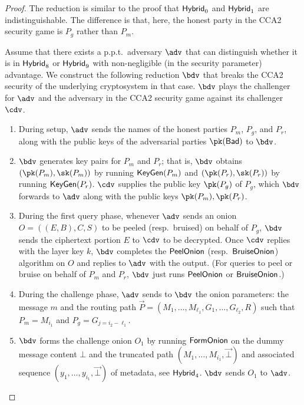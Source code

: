 \documentclass[runningheads,a4paper]{llncs}
\begin{document}
\begin{proof}
The reduction is similar to the proof that $\mathsf{Hybrid}_{0}$ and $\mathsf{Hybrid}_{1}$ are indistinguishable. The difference is that, here, the honest party in the CCA2 security game is $P_g$ rather than $P_m$. 

Assume that there exists a p.p.t.~adversary $\adv$ that can distinguish whether it is in $\mathsf{Hybrid}_{8}$ or $\mathsf{Hybrid}_{9}$ with non-negligible (in the security parameter)  advantage. 
We construct the following reduction $\bdv$ that breaks the CCA2 security of the underlying cryptosystem in that case. $\bdv$ plays the challenger for $\adv$ and the adversary in the CCA2 security game against its challenger $\cdv$.

\begin{enumerate}
\item During setup, $\adv$ sends the names of the honest parties $P_m$, $P_g$, and $P_r$, along with the public keys of the adversarial parties $\pk(\Bad)$ to $\bdv$. 

\item $\bdv$ generates key pairs for $P_m$ and $P_r$;
that is, $\bdv$ obtains $(\pk(P_m), \sk(P_m))$ by running $\mathsf{KeyGen}(P_m)$ and $(\pk(P_r), \sk(P_r))$ by running $\mathsf{KeyGen}(P_r)$.  
$\cdv$ supplies the public key $\pk(P_g)$ of $P_g$, which $\bdv$ forwards to $\adv$ along with the public keys $\pk(P_m), \pk(P_r)$.  

\item During the first query phase, whenever $\adv$ sends an onion $O=((E, B), C, S)$ to be peeled (resp.~bruised) on behalf of $P_g$, $\bdv$ sends the ciphertext portion $E$ to $\cdv$ to be decrypted. Once $\cdv$ replies with the layer key $k$, $\bdv$ completes the $\mathsf{PeelOnion}$ (resp.~$\mathsf{BruiseOnion}$) algorithm on $O$ and replies to $\adv$ with the output. (For queries to peel or bruise on behalf of $P_m$ and $P_r$, $\bdv$ just runs $\mathsf{PeelOnion}$ or $\mathsf{BruiseOnion}$.)  

\item During the challenge phase, $\adv$ sends to $\bdv$ the onion parameters: the message $m$ and the routing path $\vec{P} = (M_1, \dots, M_{\ell_1}, G_1, \dots, G_{\ell_2}, R)$ such that $P_m = M_{i_1}$ and $P_g = G_{j=i_2-\ell_1}$. 

\item $\bdv$ forms the challenge onion $O_1$ by running $\mathsf{FormOnion}$ on the dummy message content $\bot$ and the truncated path $(M_1, \dots, M_{i_1}, \vec{\bot})$ and associated sequence $(y_1, \dots, y_{i_1}, \vec{\bot})$ of metadata, see $\mathsf{Hybrid}_{4}$. 
$\bdv$ sends $O_1$ to $\adv$.  


\end{enumerate}
\end{proof}
\end{document}
